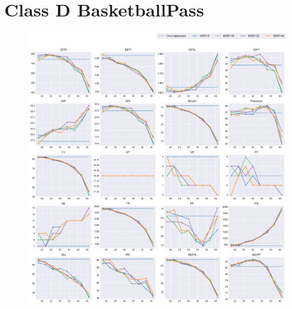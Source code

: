 
\section{Class D BasketballPass}
\label{sec:appendix/BasketballPass_all}


\begin{figure}[!htbp]
\centering
\includegraphics[width=1.0\linewidth]{img/appendix/BasketballPass_all_multiplots_qp.pdf}
\caption[Result of all object classes in Class D BasketballPass with Horizontal Axis of QP]{}
\label{fig:BasketballPass_all_qp}
\end{figure}

